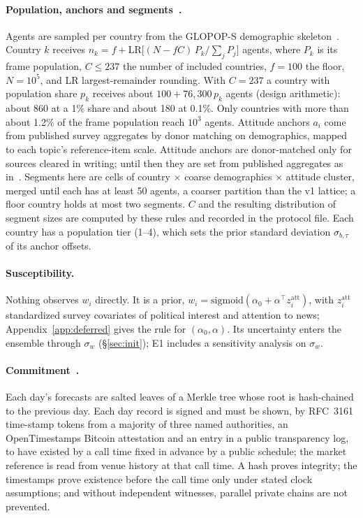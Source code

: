\documentclass[10pt]{article}
\theoremstyle{remark}
\begin{document}
\paragraph{Population, anchors and segments~\cite{rw_unequally}.} Agents are sampled per country from the GLOPOP-S demographic skeleton~\cite{ton2024glopopdata}. Country $k$ receives $n_k=f+\mathrm{LR}\big[(N-fC)\,P_k/\sum_jP_j\big]$ agents, where $P_k$ is its frame population, $C\le237$ the number of included countries, $f=100$ the floor, $N=10^5$, and LR largest-remainder rounding. With $C=237$ a country with population share $p_k$ receives about $100+76{,}300\,p_k$ agents (design arithmetic): about 860 at a 1\% share and about 180 at 0.1\%. Only countries with more than about 1.2\% of the frame population reach $10^3$ agents. Attitude anchors $a_i$ come from published survey aggregates by donor matching on demographics, mapped to each topic's reference-item scale. Attitude anchors are donor-matched only for sources cleared in writing; until then they are set from published aggregates as in~\cite{rw_askaworld}. Segments here are cells of country $\times$ coarse demographics $\times$ attitude cluster, merged until each has at least 50 agents, a coarser partition than the v1 lattice; a floor country holds at most two segments. $C$ and the resulting distribution of segment sizes are computed by these rules and recorded in the protocol file. Each country has a population tier (1--4), which sets the prior standard deviation $\sigma_{b,\tau}$ of its anchor offsets.
\paragraph{Susceptibility.} Nothing observes $w_i$ directly. It is a prior, $w_i=\mathrm{sigmoid}(\alpha_0+\alpha^\top z_i^{\mathrm{att}})$, with $z_i^{\mathrm{att}}$ standardized survey covariates of political interest and attention to news; Appendix~\ref{app:deferred} gives the rule for $(\alpha_0,\alpha)$. Its uncertainty enters the ensemble through $\sigma_w$ (\S\ref{sec:init}); E1 includes a sensitivity analysis on $\sigma_w$.
\paragraph{Commitment~\cite{rw_receipts}.} Each day's forecasts are salted leaves of a Merkle tree whose root is hash-chained to the previous day. Each day record is signed and must be shown, by RFC~3161 time-stamp tokens from a majority of three named authorities, an OpenTimestamps Bitcoin attestation and an entry in a public transparency log, to have existed by a call time fixed in advance by a public schedule; the market reference is read from venue history at that call time. A hash proves integrity; the timestamps prove existence before the call time only under stated clock assumptions; and without independent witnesses, parallel private chains are not prevented.
\end{document}
